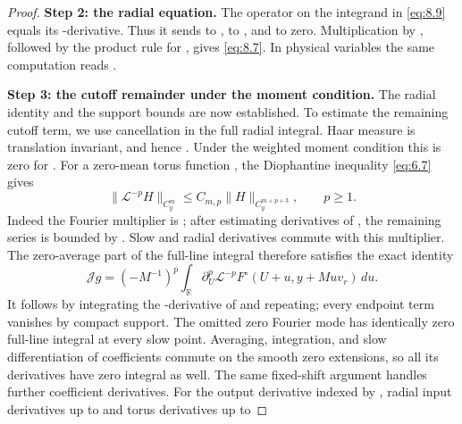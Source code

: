 \begin{proof}
\noindent\textbf{Step 2: the radial equation.} The operator
 on the integrand in \eqref{eq:8.9} equals its
-derivative. Thus it sends  to
,  to , and
 to zero. Multiplication by
, followed by the product rule for
, gives \eqref{eq:8.7}. In physical variables the same computation
reads .

\noindent\textbf{Step 3: the cutoff remainder under the moment condition.} The radial identity and
the support bounds are now established. To estimate the remaining cutoff term, we use cancellation
in the full radial integral. Haar measure is translation invariant, and hence
. Under the weighted
moment condition this is zero for . For a zero-mean torus function
, the Diophantine inequality \eqref{eq:6.7} gives
\begin{equation}
\|\mathcal L^{-p}H\|_{C_y^m}\le C_{m,p}\|H\|_{C_y^{m+p+3}},
\qquad p\ge1.
\tag{8.10}\label{eq:8.10}
\end{equation}
Indeed the Fourier multiplier is ; after estimating
 derivatives of , the remaining series is bounded
by . Slow and radial derivatives commute
with this multiplier. The zero-average part of the full-line integral therefore satisfies the exact
identity
\[
\mathcal Jg=(-M^{-1})^p\int_{\mathbb R}\partial_U^p\mathcal L^{-p}F^\circ
   (U+u,y+Muv_r)\,du.
\]
It follows by integrating the -derivative of
 and repeating; every endpoint term vanishes by compact
support. The omitted zero Fourier mode has identically zero full-line
%
integral at every slow point. Averaging, integration, and slow differentiation of coefficients
commute on the smooth zero extensions, so all its derivatives have zero integral as well. The
same fixed-shift argument handles further coefficient derivatives. For the output derivative
indexed by , radial input derivatives up to
 and torus derivatives up to

\end{proof}
